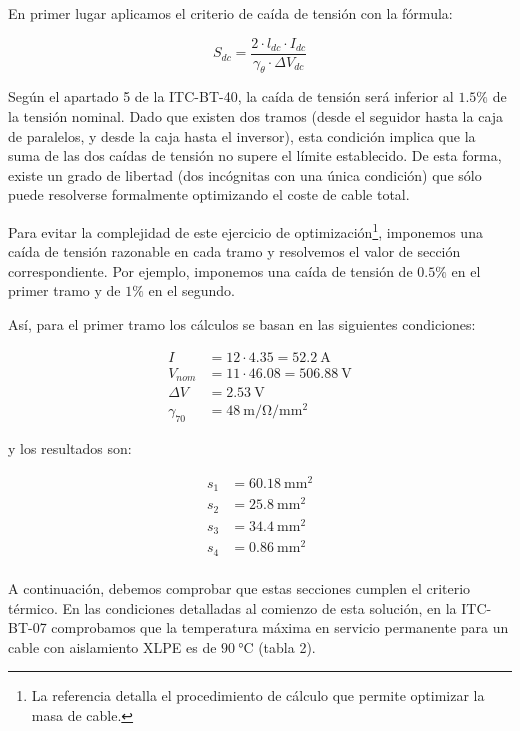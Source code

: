 En primer lugar aplicamos el criterio de caída de tensión con la fórmula:

\[S_{dc} =  \frac{2\cdot l_{dc}\cdot I_{dc}}{\gamma_\theta\cdot\Delta V_{dc}}\]

Según el apartado 5 de la ITC-BT-40, la caída de tensión será inferior
al $1.5\%$ de la tensión nominal. Dado que existen dos tramos (desde el
seguidor hasta la caja de paralelos, y desde la caja hasta el
inversor), esta condición implica que la suma de las dos caídas de
tensión no supere el límite establecido. De esta forma, existe un
grado de libertad (dos incógnitas con una única condición) que sólo
puede resolverse formalmente optimizando el coste de cable total. 

Para evitar la complejidad de este ejercicio de
optimización\footnote{La referencia \cite{Perpinan2012b} detalla el
  procedimiento de cálculo que permite optimizar la masa de cable.}, imponemos una
caída de tensión razonable en cada tramo y resolvemos el valor de
sección correspondiente. Por ejemplo, imponemos una caída de tensión
de $0.5\%$ en el primer tramo y de $1\%$  en el segundo.

Así, para el primer tramo los cálculos se basan en las siguientes condiciones:

\begin{align*}
  I & = 12 \cdot 4.35 = \SI{52.2}{\ampere}\\
  V_{nom} & = 11 \cdot 46.08 = \SI{506.88}{\volt}\\
  \Delta V & = \SI{2.53}{\volt}\\
  \gamma_{70} &= \SI{48}{\meter\per\ohm\per\milli\meter\squared}
\end{align*}

y los resultados son:

\begin{align*}
  s_1 & = \SI{60.18}{\milli\meter\squared}\\
  s_2 & = \SI{25.8}{\milli\meter\squared}\\
  s_3 & = \SI{34.4}{\milli\meter\squared}\\
  s_4 & = \SI{0.86}{\milli\meter\squared}\\
\end{align*}

A continuación, debemos comprobar que estas secciones cumplen el
criterio térmico. En las condiciones detalladas al comienzo de esta
solución, en la ITC-BT-07 comprobamos que la temperatura máxima en
servicio permanente para un cable con aislamiento XLPE es de
$\SI{90}{\celsius}$ (tabla 2). 

